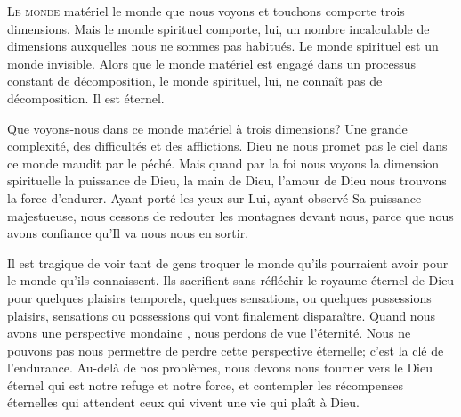 




\lettrine{L}{e monde} matériel \ocadr le monde que nous voyons
 et touchons \fcadr{} comporte trois dimensions.
 Mais le monde spirituel comporte, lui, un nombre incalculable
 de dimensions auxquelles
 nous ne sommes pas habitués. Le monde spirituel est un monde invisible.
 Alors que le monde matériel est engagé dans un processus
 constant de décomposition, le monde spirituel, lui, ne connaît pas
 de décomposition. Il est éternel.


Que voyons-nous dans ce monde matériel à trois dimensions?
 Une grande complexité, des difficultés et des afflictions.
 Dieu ne nous promet pas le ciel dans ce monde maudit par le péché.
 Mais quand par la foi nous voyons la dimension spirituelle
 \ocadr la puissance de Dieu, la main de Dieu, l'amour de Dieu \fcadr{}
 nous trouvons la force d'endurer. Ayant porté les yeux sur Lui,
 ayant observé Sa puissance majestueuse, nous cessons de redouter
 les montagnes devant nous, parce que nous avons confiance
 qu'Il va nous nous en sortir.

Il est tragique de voir tant de gens troquer le monde
 qu'ils pourraient avoir pour le monde qu'ils connaissent.
 Ils sacrifient sans réfléchir le royaume éternel de Dieu
 pour quelques plaisirs temporels, quelques sensations, ou quelques possessions
 \ocadr plaisirs, sensations ou possessions qui vont finalement disparaître.
 Quand nous avons une perspective mondaine ,
 nous perdons de vue l'éternité. Nous ne pouvons pas nous permettre de perdre
 cette perspective éternelle; c'est la clé de l'endurance.
 Au-delà de nos problèmes, nous devons nous tourner vers le Dieu éternel
 qui est notre refuge et notre force, et contempler les récompenses
 éternelles qui attendent ceux qui vivent une vie qui plaît à Dieu.

